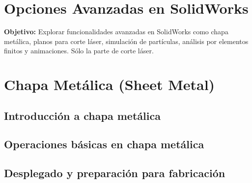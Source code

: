 \section{Opciones Avanzadas en SolidWorks}

\textbf{Objetivo:} Explorar funcionalidades avanzadas en SolidWorks como chapa metálica, planos para corte láser, simulación de partículas, análisis por elementos finitos y animaciones. Sólo la parte de corte láser. 


\section{Chapa Metálica (Sheet Metal)}

\subsection{Introducción a chapa metálica}

\subsection{Operaciones básicas en chapa metálica}

\subsection{Desplegado y preparación para fabricación}


